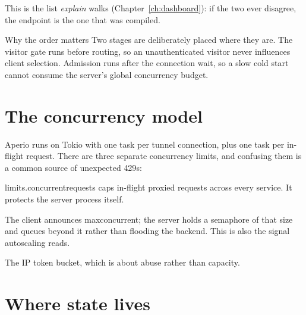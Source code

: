 \documentclass[11pt,a4paper,oneside]{book}
\newcommand{\aperiobreakableunderscore}{\textunderscore\allowbreak}
\newcommand{\aperiocodebreaks}{\XeTeXinterchartokenstate=1 }
\newcommand{\aperiocodebreaks}{}
\DeclareRobustCommand{\code}[1]{{\ttfamily\small\aperiocodebreaks
  \let\_\aperiobreakableunderscore#1}}
\begin{document}
This is the list \emph{explain} walks (Chapter~\ref{ch:dashboard}): if
the two ever disagree, the endpoint is the one that was compiled.

\begin{aperionote}{Why the order matters}
Two stages are deliberately placed where they are. The visitor gate runs
before routing, so an unauthenticated visitor never influences client
selection. Admission runs after the connection wait, so a slow cold start
cannot consume the server's global concurrency budget.
\end{aperionote}

\section{The concurrency model}

Aperio runs on Tokio with one task per tunnel connection, plus one task
per in-flight request. There are three separate concurrency limits, and
confusing them is a common source of unexpected \code{429}s:

\begin{description}[leftmargin=1.6em,style=nextline]
  \item[Server-wide] \code{limits.concurrent\_requests} caps
        in-flight proxied requests across every service. It protects the
        server process itself.
  \item[Per client] The client announces \code{max\_concurrent}; the
        server holds a semaphore of that size and queues beyond it rather
        than flooding the backend. This is also the signal autoscaling
        reads.
  \item[Per visitor] The IP token bucket, which is about abuse rather
        than capacity.
\end{description}

\section{Where state lives}
\end{document}
